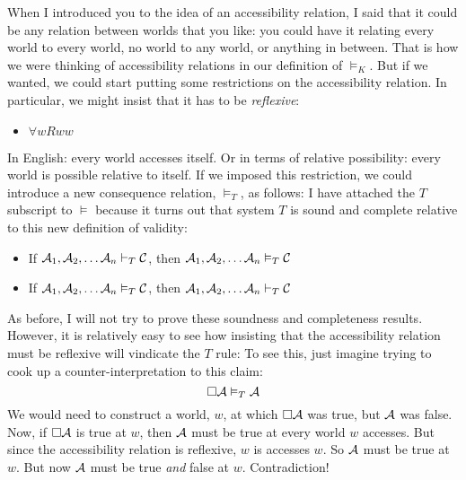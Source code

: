When I introduced you to the idea of an accessibility relation, I said that it could be any relation between worlds that you like: you could have it relating every world to every world, no world to any world, or anything in between. That is how we were thinking of accessibility relations in our definition of $\vDash_K$. But if we wanted, we could start putting some restrictions on the accessibility relation. In particular, we might insist that it has to be \emph{reflexive}:
\begin{itemize}
\item $\forall wRww$
\end{itemize}
In English: every world accesses itself. Or in terms of relative possibility: every world is possible relative to itself. If we imposed this restriction, we could introduce a new consequence relation, $\vDash_T$, as follows:
I have attached the $T$ subscript to $\vDash$ because it turns out that system $T$ is sound and complete relative to this new definition of validity:
\begin{itemize}
\item If $\mathcal{A}_1,\mathcal{A}_2, \dots \mathcal{A}_n\vdash_T\mathcal{C}$, then $\mathcal{A}_1,\mathcal{A}_2, \dots \mathcal{A}_n\vDash_T\mathcal{C}$
\item If $\mathcal{A}_1,\mathcal{A}_2, \dots \mathcal{A}_n\vDash_T\mathcal{C}$, then $\mathcal{A}_1,\mathcal{A}_2, \dots \mathcal{A}_n\vdash_T\mathcal{C}$
\end{itemize}
As before, I will not try to prove these soundness and completeness results. However, it is relatively easy to see how insisting that the accessibility relation must be reflexive will vindicate the $T$ rule:
To see this, just imagine trying to cook up a counter-interpretation to this claim:
\[
\Box \mathcal{A}\vDash_T \mathcal{A}
\]
We would need to construct a world, $w$, at which $\Box \mathcal{A}$ was true, but $\mathcal{A}$ was false. Now, if $\Box \mathcal{A}$ is true at $w$, then $\mathcal{A}$ must be true at every world $w$ accesses. But since the accessibility relation is reflexive, $w$ is accesses $w$. So $\mathcal{A}$ must be true at $w$. But now $\mathcal{A}$ must be true \emph{and} false at $w$. Contradiction!

